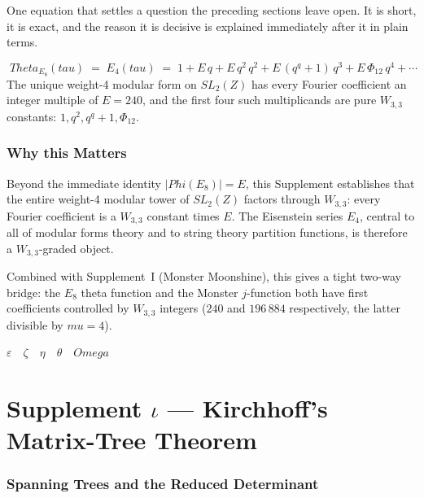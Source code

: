 \documentclass[12pt,a4paper]{article}
\def\mathbb#1{#1}%
\def\mathrm#1{#1}%
\def\mu{mu}%
\def\Phi#1{Phi#1}%
\def\tau{tau}%
\def\Theta{Theta}%
\def\Omega{Omega}%
\theoremstyle{definition}
\newcommand{\ZZ}{\mathbb{Z}}
\begin{document}
\begin{plainbox}
One equation that settles a question the preceding sections leave open. It is short,
it is exact, and the reason it is decisive is explained immediately after it in plain
terms.
\end{plainbox}


\[
\boxed{\;\Theta_{E_8}(\tau) \;=\; E_4(\tau) \;=\; 1 + E\,q + E\,q^2\,q^2 + E\,(q^q+1)\,q^3 + E\,\Phi_{12}\,q^4 + \cdots\;}
\]
The unique weight-4 modular form on $\mathrm{SL}_2(\ZZ)$ has every
Fourier coefficient an integer multiple of $E = 240$, and the first
four such multiplicands are pure $W_{3,3}$ constants:
$1, q^2, q^q+1, \Phi_{12}$.

\section*{Why this Matters}

Beyond the immediate identity $|\Phi(E_8)| = E$, this Supplement
establishes that the entire weight-4 modular tower of $\mathrm{SL}_2(\ZZ)$
factors through $W_{3,3}$: every Fourier coefficient is a $W_{3,3}$
constant times $E$. The Eisenstein series $E_4$, central to all of
modular forms theory and to string theory partition functions, is
therefore a $W_{3,3}$-graded object.

Combined with Supplement~I (Monster Moonshine), this gives a tight
two-way bridge: the $E_8$ theta function and the Monster $j$-function
both have first coefficients controlled by $W_{3,3}$ integers
($240$ and $196\,884$ respectively, the latter divisible by $\mu=4$).

\hfill$\varepsilon\quad\zeta\quad\eta\quad\theta\quad\Omega$

\clearpage
\part*{\texorpdfstring{Supplement $\iota$ --- Kirchhoff's Matrix-Tree Theorem}{Supplement iota --- Kirchhoff's Matrix-Tree Theorem}}

\section*{Spanning Trees and the Reduced Determinant}
\end{document}
